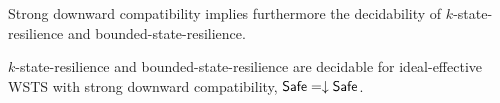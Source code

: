 Strong downward compatibility implies furthermore the decidability
of {\sc $k$-state-resilience} and {\sc bounded-state-resilience}.

\begin{corollary}\label{downward brp}
{\sc $k$-state-resilience} and {\sc bounded-state-resilience} are decidable for ideal-effective WSTS with strong downward compatibility,
$\textsf{Safe} = \downarrow \textsf{Safe}$.
\end{corollary}




